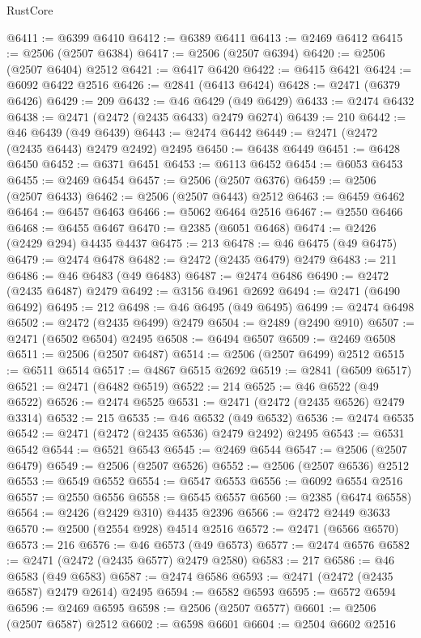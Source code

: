 \begin{lexlean}{RustCore}
\begin{coremodule}
@6411 := @6399 @6410
@6412 := @6389 @6411
@6413 := @2469 @6412
@6415 := @2506 (@2507 @6384)
@6417 := @2506 (@2507 @6394)
@6420 := @2506 (@2507 @6404) @2512
@6421 := @6417 @6420
@6422 := @6415 @6421
@6424 := @6092 @6422 @2516
@6426 := @2841 (@6413 @6424)
@6428 := @2471 (@6379 @6426)
@6429 := 209
@6432 := @46 @6429 (@49 @6429)
@6433 := @2474 @6432
@6438 := @2471 (@2472 (@2435 @6433) @2479 @6274)
@6439 := 210
@6442 := @46 @6439 (@49 @6439)
@6443 := @2474 @6442
@6449 := @2471 (@2472 (@2435 @6443) @2479 @2492) @2495
@6450 := @6438 @6449
@6451 := @6428 @6450
@6452 := @6371 @6451
@6453 := @6113 @6452
@6454 := @6053 @6453
@6455 := @2469 @6454
@6457 := @2506 (@2507 @6376)
@6459 := @2506 (@2507 @6433)
@6462 := @2506 (@2507 @6443) @2512
@6463 := @6459 @6462
@6464 := @6457 @6463
@6466 := @5062 @6464 @2516
@6467 := @2550 @6466
@6468 := @6455 @6467
@6470 := @2385 (@6051 @6468)
@6474 := @2426 (@2429 @294) @4435 @4437
@6475 := 213
@6478 := @46 @6475 (@49 @6475)
@6479 := @2474 @6478
@6482 := @2472 (@2435 @6479) @2479
@6483 := 211
@6486 := @46 @6483 (@49 @6483)
@6487 := @2474 @6486
@6490 := @2472 (@2435 @6487) @2479
@6492 := @3156 @4961 @2692
@6494 := @2471 (@6490 @6492)
@6495 := 212
@6498 := @46 @6495 (@49 @6495)
@6499 := @2474 @6498
@6502 := @2472 (@2435 @6499) @2479
@6504 := @2489 (@2490 @910)
@6507 := @2471 (@6502 @6504) @2495
@6508 := @6494 @6507
@6509 := @2469 @6508
@6511 := @2506 (@2507 @6487)
@6514 := @2506 (@2507 @6499) @2512
@6515 := @6511 @6514
@6517 := @4867 @6515 @2692
@6519 := @2841 (@6509 @6517)
@6521 := @2471 (@6482 @6519)
@6522 := 214
@6525 := @46 @6522 (@49 @6522)
@6526 := @2474 @6525
@6531 := @2471 (@2472 (@2435 @6526) @2479 @3314)
@6532 := 215
@6535 := @46 @6532 (@49 @6532)
@6536 := @2474 @6535
@6542 := @2471 (@2472 (@2435 @6536) @2479 @2492) @2495
@6543 := @6531 @6542
@6544 := @6521 @6543
@6545 := @2469 @6544
@6547 := @2506 (@2507 @6479)
@6549 := @2506 (@2507 @6526)
@6552 := @2506 (@2507 @6536) @2512
@6553 := @6549 @6552
@6554 := @6547 @6553
@6556 := @6092 @6554 @2516
@6557 := @2550 @6556
@6558 := @6545 @6557
@6560 := @2385 (@6474 @6558)
@6564 := @2426 (@2429 @310) @4435 @2396
@6566 := @2472 @2449 @3633
@6570 := @2500 (@2554 @928) @4514 @2516
@6572 := @2471 (@6566 @6570)
@6573 := 216
@6576 := @46 @6573 (@49 @6573)
@6577 := @2474 @6576
@6582 := @2471 (@2472 (@2435 @6577) @2479 @2580)
@6583 := 217
@6586 := @46 @6583 (@49 @6583)
@6587 := @2474 @6586
@6593 := @2471 (@2472 (@2435 @6587) @2479 @2614) @2495
@6594 := @6582 @6593
@6595 := @6572 @6594
@6596 := @2469 @6595
@6598 := @2506 (@2507 @6577)
@6601 := @2506 (@2507 @6587) @2512
@6602 := @6598 @6601
@6604 := @2504 @6602 @2516

\end{coremodule}
\end{lexlean}
